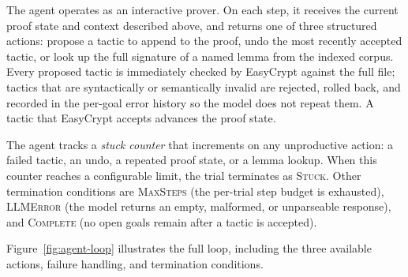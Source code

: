\documentclass[acmsmall,natbib=false]{acmart}
\begin{document}
The agent operates as an interactive prover. On each step, it receives the current proof state and context described above, and returns one of three structured actions: propose a tactic to append to the proof, undo the most recently accepted tactic, or look up the full signature of a named lemma from the indexed corpus. Every proposed tactic is immediately checked by EasyCrypt against the full file; tactics that are syntactically or semantically invalid are rejected, rolled back, and recorded in the per-goal error history so the model does not repeat them. A tactic that EasyCrypt accepts advances the proof state.

The agent tracks a \textit{stuck counter} that increments on any unproductive action: a failed tactic, an undo, a repeated proof state, or a lemma lookup. When this counter reaches a configurable limit, the trial terminates as \textsc{Stuck}. Other termination conditions are \textsc{MaxSteps} (the per-trial step budget is exhausted), \textsc{LLMError} (the model returns an empty, malformed, or unparseable response), and \textsc{Complete} (no open goals remain after a tactic is accepted).

Figure~\ref{fig:agent-loop} illustrates the full loop, including the three available actions, failure handling, and termination conditions.
\end{document}
